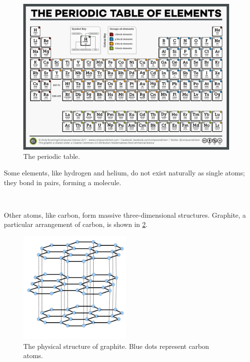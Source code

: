 \documentclass[a4paper]{memoir}
\begin{document}
\begin{figure}
  \centering
  \begin{sideways}
    \includegraphics[height=1.2\textwidth]{ptable}
  \end{sideways}
  \caption{The periodic table.\label{fig:ptable1}}
\end{figure}

Some elements, like hydrogen and helium, do not exist naturally as single atoms; they bond in pairs, forming a molecule.

\begin{center}
  \\
\end{center}

Other atoms, like carbon, form massive three-dimensional structures. Graphite, a particular arrangement of carbon, is shown in \cref{fig:graphite2}.

\begin{figure}
  \centering
  \includegraphics[width=0.5\textwidth]{graphite2}
  \caption{The physical structure of graphite. Blue dots represent carbon atoms.\label{fig:graphite2}}
\end{figure}
\end{document}
